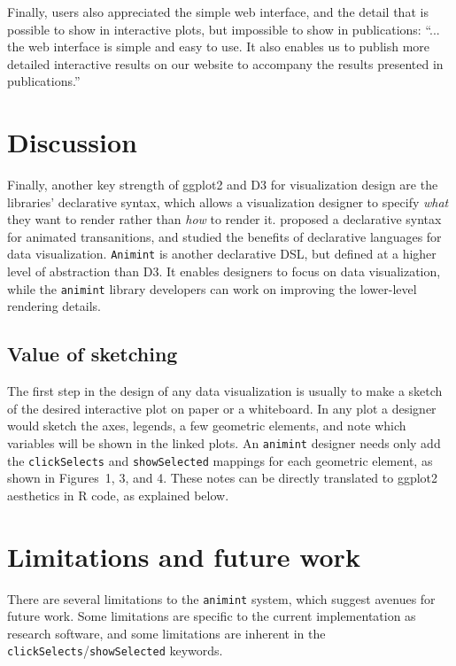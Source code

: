 \documentclass[journal]{vgtc}\usepackage[]{graphicx}\usepackage[]{color}
\begin{document}
Finally, users also appreciated the simple web interface, and the
detail that is possible to show in interactive plots, but impossible
to show in publications: ``...  the web interface is simple and easy
to use.  It also enables us to publish more detailed interactive
results on our website to accompany the results presented in
publications.''

\section{Discussion}

Finally, another key strength of ggplot2 and D3 for visualization
design are the libraries' declarative syntax, which allows a
visualization designer to specify \emph{what} they want to render
rather than \emph{how} to render it. \citet{declarative} proposed a
declarative syntax for animated transanitions, and studied the
benefits of declarative languages for data visualization. \texttt{Animint} is
another declarative DSL, but defined at a higher level of abstraction
than D3. It enables designers to focus on data visualization, while
the \texttt{animint} library developers can work on improving the lower-level
rendering details.

\subsection{Value of sketching}

The first step in the design of any data visualization is usually to
make a sketch of the desired interactive plot on paper or a
whiteboard.  In any plot a designer would sketch the axes, legends, a
few geometric elements, and note which variables will be shown in the
linked plots. An \texttt{animint} designer needs only add the
\texttt{clickSelects} and \texttt{showSelected} mappings for
each geometric element, as shown in Figures~1, 3, and 4. These notes
can be directly translated to ggplot2 aesthetics in R code, as
explained below.


\section{Limitations and future work}

There are several limitations to the \texttt{animint} system, which suggest
avenues for future work. Some limitations are specific to the current
implementation as research software, and some limitations are inherent
in the \texttt{clickSelects}/\texttt{showSelected} keywords.
\end{document}
